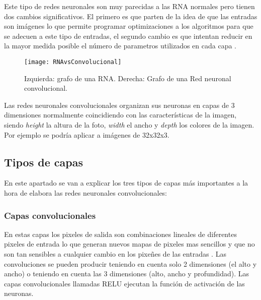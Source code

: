 Este tipo de redes neuronales son muy parecidas a las RNA normales pero tienen dos cambios significativos. El primero es que parten de la idea de que las entradas son imágenes lo que permite programar optimizaciones a los algoritmos para que se adecuen a este tipo de entradas, el segundo cambio es que intentan reducir en la mayor medida posible el número de parametros utilizados en cada capa \cite{redesNeuronalesConvolucionales}.

\begin{figure}[h]
    \begin{center}%
        \begin{center}%
          \texttt{[image: RNAvsConvolucional]}%
          \caption[Comparativa de grafos]{Izquierda: grafo de una RNA. Derecha: Grafo de una Red neuronal convolucional.}%
          \label{figRNAvsConvolucional}%
        \end{center}%
  	\end{center}%
\end{figure}%

Las redes neuronales convolucionales organizan sus neuronas en capas de 3 dimensiones normalmente coincidiendo con las características de la imagen, siendo \textit{height} la altura de la foto, \textit{width} el ancho y \textit{depth} los colores de la imagen. Por ejemplo se podría aplicar a imágenes de 32x32x3.

\subsection{Tipos de capas}

En este apartado se van a explicar los tres tipos de capas más importantes a la hora de elabora las redes neuronales convolucionales:
\subsubsection{Capas convolucionales}

En estas capas los pixeles de salida son combinaciones lineales de diferentes pixeles de entrada lo que generan nuevos mapas de pixeles mas sencillos y que no son tan sensibles a cualquier cambio en los pixeñes de las entradas \cite{redesConvolucionales}. Las convoluciones se pueden producir teniendo en cuenta solo 2 dimensiones (el alto y ancho) o teniendo en cuenta las 3 dimensiones (alto, ancho y profundidad). Las capas convolucionales llamadas RELU ejecutan la función de activación de las neuronas.

